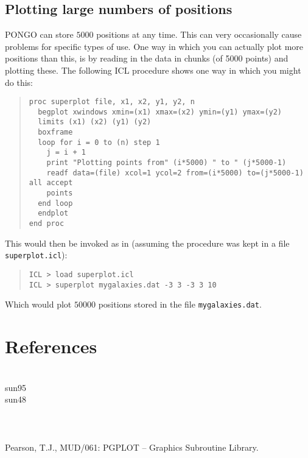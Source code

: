 \subsection{Plotting large numbers of positions}
PONGO can store $5000$ positions at any time. This can very
occasionally cause problems for specific types of use. One way in
which you can actually plot more positions than this, is by reading in
the data in chunks (of 5000 points) and plotting these. The following
ICL procedure shows one way in which you might do this:
\begin{quote}
\begin{verbatim}
proc superplot file, x1, x2, y1, y2, n
  begplot xwindows xmin=(x1) xmax=(x2) ymin=(y1) ymax=(y2)
  limits (x1) (x2) (y1) (y2)
  boxframe
  loop for i = 0 to (n) step 1
    j = i + 1
    print "Plotting points from" (i*5000) " to " (j*5000-1)
    readf data=(file) xcol=1 ycol=2 from=(i*5000) to=(j*5000-1) all accept
    points
  end loop
  endplot
end proc
\end{verbatim}
\end{quote}
This would then be invoked as in (assuming the procedure was kept in a
file \verb+superplot.icl+):
\begin{quote}
\begin{verbatim}
ICL > load superplot.icl
ICL > superplot mygalaxies.dat -3 3 -3 3 10
\end{verbatim}
\end{quote}
Which would plot $50000$ positions stored in the file \verb+mygalaxies.dat+.

\section{References}

 \\
{sun95}{}\\
{sun48}{}\\
\\
\\
\\
Pearson, T.J., MUD/061: PGPLOT -- Graphics Subroutine Library.\\

